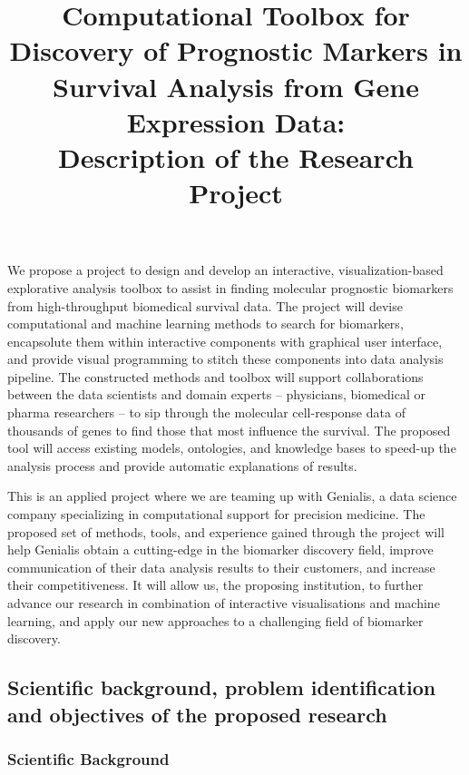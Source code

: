 \documentclass[11pt,a4paper]{article}
\begin{document}
\title{Computational Toolbox for Discovery of Prognostic Markers in Survival Analysis from Gene Expression Data: \\
Description of the Research Project}
\author{}
\date{}
\maketitle

We propose a project to design and develop an interactive, visualization-based explorative analysis toolbox to assist in finding molecular prognostic biomarkers from high-throughput biomedical survival data. The project will devise computational and machine learning methods to search for biomarkers, encapsolute them within interactive components with graphical user interface, and provide visual programming to stitch these components into data analysis pipeline. The constructed methods and toolbox will support collaborations between the data scientists and domain experts – physicians, biomedical or pharma researchers – to sip through the molecular cell-response data of thousands of genes to find those that most influence the survival. The proposed tool will access existing models, ontologies, and knowledge bases to speed-up the analysis process and provide automatic explanations of results. 

This is an applied project where we are teaming up with Genialis, a data science company specializing in computational support for precision medicine. The proposed set of methods, tools, and experience gained through the project will help Genialis obtain a cutting-edge in the biomarker discovery field, improve communication of their data analysis results to their customers, and increase their competitiveness. It will allow us, the proposing institution, to further advance our research in combination of interactive visualisations and machine learning, and apply our new approaches to a challenging field of biomarker discovery.

\subsection{Scientific background, problem identification and objectives of the proposed research}



\subsubsection*{Scientific Background}
\end{document}
